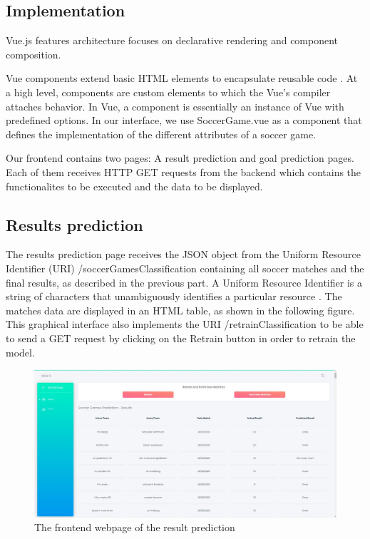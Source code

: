 \subsection{Implementation}
Vue.js features architecture focuses on declarative rendering and component composition.

Vue components extend basic HTML elements to encapsulate reusable code \cite{vue:2020}.
At a high level, components are custom elements to which the Vue's compiler attaches behavior. 
In Vue, a component is essentially an instance of Vue with predefined options.
In our interface, we use SoccerGame.vue as a component that defines the implementation of the different attributes of a soccer game.

Our frontend contains two pages: A result prediction and goal prediction pages. Each of them 
receives HTTP GET requests from the backend which contains the functionalites to be executed and the data to be displayed.

\subsection{Results prediction}

The results prediction page receives the JSON object from the Uniform Resource Identifier (URI) /soccerGamesClassification containing all soccer matches and the final results, as described in the previous part.
A Uniform Resource Identifier is a string of characters that unambiguously identifies a particular resource \cite{uri:2005}.
The matches data are displayed in an HTML table, as shown in the following figure.
This graphical interface also implements the URI /retrainClassification to be able to send a GET request by clicking on the Retrain button in order to retrain the model.

\begin{figure}[H]
    \centering
    \includegraphics[width=1\textwidth]{images/frontend_results_prediction.jpg}
    \caption{The frontend webpage of the result prediction}
    \label{fig:result_frontend}
    \end{figure}

